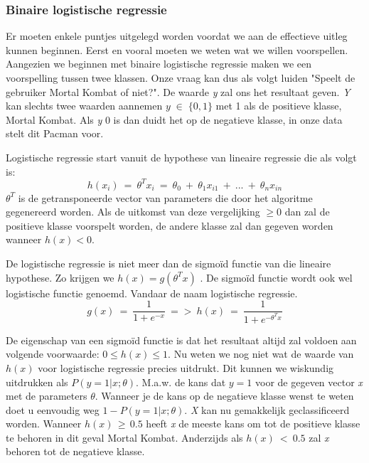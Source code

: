 \subsubsection{Binaire logistische regressie}
\label{sec:Binaire-logistische-regressie}

Er moeten enkele puntjes uitgelegd worden voordat we aan de effectieve uitleg kunnen beginnen. Eerst en vooral moeten we weten wat we willen voorspellen. Aangezien we beginnen met binaire logistische regressie maken we een voorspelling tussen twee klassen. Onze vraag kan dus als volgt luiden "Speelt de gebruiker Mortal Kombat of niet?". De waarde \textit{y} zal ons het resultaat geven. \textit{Y} kan slechts twee waarden aannemen $y \; \in \; \{0,1\}$ met 1 als de positieve klasse, Mortal Kombat. Als \textit{y} 0 is dan duidt het op de negatieve klasse, in onze data stelt dit Pacman voor. 

Logistische regressie start vanuit de hypothese van lineaire regressie die als volgt is: 
$$
h(x_{i}) \:= \: \theta^{T}x_{i} \:=\: \theta_{0} \:+ \:\theta_{1}x_{i1} \:+ \: ...\: + \: \theta_{n}x_{in}
$$
$ \theta^{T}$ is de getransponeerde vector van parameters die door het algoritme gegenereerd worden. Als de uitkomst van deze vergelijking $\geq 0$ dan zal de positieve klasse voorspelt worden, de andere klasse zal dan gegeven worden wanneer $h(x) < 0$. 

De logistische regressie is niet meer dan de sigmoïd functie van die lineaire hypothese. Zo krijgen we $h(x) = g(\theta^{T}x)$ . De sigmoïd functie wordt ook wel logistische functie genoemd. Vandaar de naam logistische regressie. 
$$
g(x) \: = \: {\frac{1}{1+e^{-x}}} \: => \: h(x) \: = \:{\frac{1}{1+e^{-\theta^{T}x }}}
$$

De eigenschap van een sigmoïd functie is dat het resultaat altijd zal voldoen aan volgende voorwaarde: $ 0 \leq h(x) \leq1$. 
Nu weten we nog niet wat de waarde van $h(x)$ voor logistische regressie precies uitdrukt. Dit kunnen we wiskundig uitdrukken als $P(y=1|x;\theta)$. M.a.w. de kans dat $y = 1$ voor de gegeven vector \textit{x} met de parameters $\theta$. Wanneer je de kans op de negatieve klasse wenst te weten doet u eenvoudig weg $1 - P(y=1|x;\theta)$. 
\textit{X} kan nu gemakkelijk geclassificeerd worden. Wanneer $h(x)\,\geq\,0.5$ heeft \textit{x} de meeste kans om tot de positieve klasse te behoren in dit geval Mortal Kombat. Anderzijds als $h(x)\:<\:0.5$ zal \textit{x} behoren tot de negatieve klasse. 

